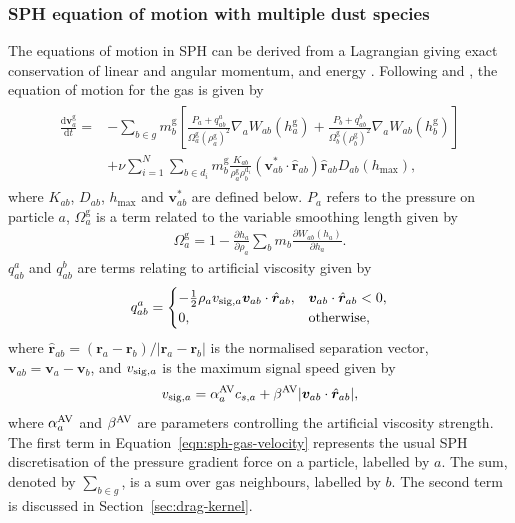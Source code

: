 \documentclass[fleqn,usenatbib]{mnras}
\newcommand{\g}{\mathrm{g}}
\newcommand{\dd}{\mathrm{d}}
\let\vec\bm
\begin{document}
\subsubsection{SPH equation of motion with multiple dust species}

The equations of motion in SPH can be derived from a Lagrangian giving exact
conservation of linear and angular momentum, and energy
\citep{Price2012JCoPh.231..759P}. Following \citet{Laibe2012MNRAS.420.2345L} and
\citet{Price2020MNRAS.495.3929P}, the equation of motion for the gas is given by
%
\begin{align}
   \label{eqn:sph-gas-velocity}
   \begin{split}
      \frac{\dd \vec{v}^{\g}_a}{\dd t} = &- \sum_{b \in g} m^{\g}_b \left[
         \frac{P_a + q_{ab}^a}{\Omega^{\g}_a {\left(\rho^{\g}_a\right)}^2} \nabla_a W_{ab}(h^{\g}_a) +
         \frac{P_b + q_{ab}^b}{\Omega^{\g}_b {\left(\rho^{\g}_b\right)}^2} \nabla_a W_{ab}(h^{\g}_b)
      \right] \\
      &+ \nu \sum_{i=1}^N \sum_{b \in d_i} m^{\g}_b \frac{K_{ab}}{\rho^{\g}_a \rho^{\dd_i}_b}
         (\vec{v}^{*}_{ab} \cdot \hat{\vec{r}}_{ab}) \hat{\vec{r}}_{ab} D_{ab}(h_{\max}),
   \end{split}
\end{align}
%
where \(K_{ab}\), \(D_{ab}\), \(h_{\max}\) and \(\vec{v}^{*}_{ab}\) are defined
below. \(P_a\) refers to the pressure on particle \(a\), \(\Omega^{\g}_a\) is a
term related to the variable smoothing length given by
%
\begin{align}
   \Omega^{\g}_a = 1 - \frac{\partial h_a}{\partial \rho_a}
      \sum_b m_b \frac{\partial W_{ab}(h_a)}{\partial h_a}.
\end{align}
%
\(q_{ab}^a\) and \(q_{ab}^b\) are terms relating to artificial viscosity given
by
%
\begin{align}
   q_{ab}^a =
   \begin{cases}
      -\frac{1}{2} \rho_a v_{{\rm sig}, a} \vec{v}_{ab} \cdot \hat{\vec{r}}_{ab},
         &\vec{v}_{ab} \cdot \hat{\vec{r}}_{ab} < 0,\\
      0, &\mathrm{otherwise},
   \end{cases}
\end{align}
where \(\hat{\vec{r}}_{ab} = (\vec{r}_a - \vec{r}_b)/|\vec{r}_a - \vec{r}_b|\)
is the normalised separation vector, \(\vec{v}_{ab} = \vec{v}_a -
\vec{v}_b\), and \(v_{{\rm sig}, a}\) is the maximum signal speed given by
%
\begin{align}
   v_{{\rm sig}, a} = \alpha_a^{\rm AV} c_{s,a}
      + \beta^{\rm AV} | \vec{v}_{ab} \cdot \hat{\vec{r}}_{ab} |,
\end{align}
%
where \(\alpha_a^{\rm AV}\) and \(\beta^{\rm AV}\) are parameters controlling
the artificial viscosity strength. The first term in
Equation~\ref{eqn:sph-gas-velocity} represents the usual SPH discretisation of
the pressure gradient force on a particle, labelled by \(a\). The sum, denoted
by \(\sum_{b \in g}\), is a sum over gas neighbours, labelled by \(b\). The
second term is discussed in Section~\ref{sec:drag-kernel}.
\end{document}
